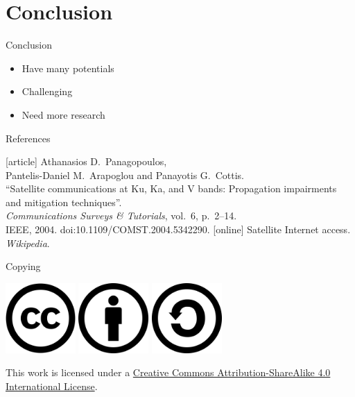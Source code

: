 \documentclass[pdf]{beamer}
\begin{document}
\section{Conclusion}
\frame{\tableofcontents[currentsection]}
\begin{frame}{Conclusion}\LARGE
  \begin{itemize}
    \item Have many potentials
    \item Challenging
    \item Need more research
  \end{itemize}
\end{frame}

\begin{frame}{References}
  \begin{thebibliography}{69}
    [article]
     Athanasios D.~Panagopoulos,\\
      Pantelis-Daniel M.~Arapoglou and Panayotis G.~Cottis.\\
      ``Satellite communications at Ku, Ka, and V bands:
      Propagation impairments and mitigation techniques''.\\
      \emph{Communications Surveys \& Tutorials}, vol.~6, p.~2--14.\\
      IEEE, 2004.  doi:10.1109/COMST.2004.5342290. 
    [online]
     Satellite Internet access.  \emph{Wikipedia}.
  \end{thebibliography}
\end{frame}

\begin{frame}{Copying}\Large
  \begin{center}
    \includegraphics[width=0.2\textwidth]{CC.png}
    \includegraphics[width=0.2\textwidth]{BY.png}
    \includegraphics[width=0.2\textwidth]{SA.png}
  \end{center}

  This work is licensed under a
  \href{https://creativecommons.org/licenses/by-sa/4.0/}{Creative Commons
  Attribution-ShareAlike 4.0 International License}.
\end{frame}
\end{document}
